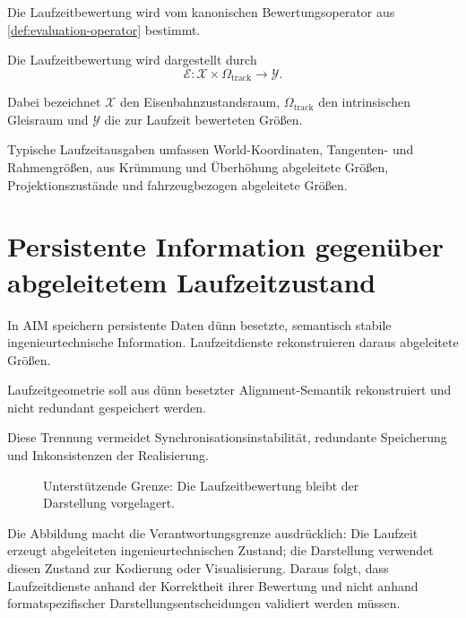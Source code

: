 Die Laufzeitbewertung wird vom kanonischen Bewertungsoperator aus
\cref{def:evaluation-operator} bestimmt.

\begin{definition}[Laufzeitbewertung]
\label{def:runtime-evaluation}
Die Laufzeitbewertung wird dargestellt durch
\[
\mathcal E
:
\mathcal X
\times
\Omega_{\mathrm{track}}
\rightarrow
\mathcal Y.
\]
\end{definition}

Dabei bezeichnet \(\mathcal X\) den Eisenbahnzustandsraum,
\(\Omega_{\mathrm{track}}\) den intrinsischen Gleisraum und \(\mathcal Y\)
die zur Laufzeit bewerteten Größen.

Typische Laufzeitausgaben umfassen World-Koordinaten, Tangenten- und
Rahmengrößen, aus Krümmung und Überhöhung abgeleitete Größen,
Projektionszustände und fahrzeugbezogen abgeleitete Größen.

\section{Persistente Information gegenüber abgeleitetem Laufzeitzustand}

In AIM speichern persistente Daten dünn besetzte, semantisch stabile
ingenieurtechnische Information. Laufzeitdienste rekonstruieren daraus
abgeleitete Größen.

\begin{principle}
\label{princ:runtime-reconstruction}
Laufzeitgeometrie soll aus dünn besetzter Alignment-Semantik rekonstruiert und
nicht redundant gespeichert werden.
\end{principle}

Diese Trennung vermeidet Synchronisationsinstabilität, redundante Speicherung
und Inkonsistenzen der Realisierung.

\begin{figure}[ht]
\centering

\caption{Unterstützende Grenze: Die Laufzeitbewertung bleibt der Darstellung vorgelagert.}
\label{fig:support-runtime-representation-boundary}
\end{figure}

Die Abbildung macht die Verantwortungsgrenze ausdrücklich: Die Laufzeit
erzeugt abgeleiteten ingenieurtechnischen Zustand; die Darstellung verwendet
diesen Zustand zur Kodierung oder Visualisierung. Daraus folgt, dass
Laufzeitdienste anhand der Korrektheit ihrer Bewertung und nicht anhand
formatspezifischer Darstellungsentscheidungen validiert werden müssen.

